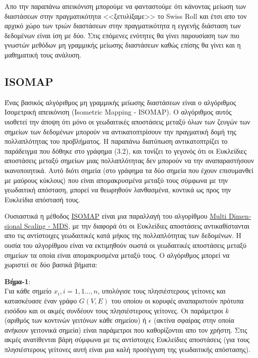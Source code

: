 \par
\vspace*{1cm}
Απο την παραπάνω απεικόνιση μπορούμε να φανταστούμε ότι κάνοντας μείωση των διαστάσεων στην πραγματικότητα <<ξετυλίξαμε>> το \textlatin{Swiss Roll} και έτσι απο τον αρχικό χώρο των τριών διαστάσεων στην πραγματικότητα η εγγενής διάσταση των δεδομένων είναι ίση με δύο. Στις επόμενες ενότητες θα γίνει παρουσίαση των πιο γνωστών μεθόδων μη γραμμικής μείωσης διαστάσεων καθώς επίσης θα γίνει και η μαθηματική τους ανάλυση.


\subsection{\textlatin{ISOMAP}}
\par
Ένας βασικός αλγόριθμος μη γραμμικής μείωσης διαστάσεων είναι ο αλγόριθμος Ισομετρική απεικόνιση \textlatin{(Isometric Mapping - ISOMAP)}\textlatin{\cite{isomap}}. Ο αλγόριθμος αυτός υιοθετεί την άποψη ότι μόνο οι γεωδαιτικές αποστάσεις μεταξύ όλων των ζευγών των σημείων των δεδομένων μπορούν να αντικατοπτρίσουν την πραγματική δομή της πολλαπλότητας του προβλήματος. Η παραπάνω διατύπωση αντικατοπτρίζει το παράδειγμα που δόθηκε στο γράφημα (3.2), και τονίζει το γεγονός ότι οι Ευκλείδιες αποστάσεις μεταξύ σημείων μιας πολλαπλότητας δεν μπορούν να την αναπαραστήσουν ικανοποιητικά. Αυτό διότι σημεία (στο γράφημα τα δύο σημεία που έχουν επισυμανθεί με μαύρους κύκλους) που είναι απομακρυσμένα μεταξύ τους σύμφωνα με την γεωδαιτική απόσταση, μπορεί να θεωρηθούν λανθασμένα, κοντικά ως προς την Ευκλείδια απόστασή τους.
\par
Ουσιαστικά η μέθοδος \href{http://isomap.stanford.edu/}{\textlatin{ISOMAP}} είναι μια παραλλαγή του αλγορίθμου \href{https://en.wikipedia.org/wiki/Multidimensional_scaling}{\textlatin{Multi Dimensional Scaling - MDS}}, με την διαφορά ότι οι Ευκλείδιες αποστάσεις αντικαθίστανται απο τις αντίστοιχες γεωδαιτικές κατά μήκος της πολλαπλότητας των δεδομένων. Η ουσία του αλγορίθμου είναι να εκτιμηθούν σωστά οι γεωδαιτικές αποστάσεις μεταξύ σημείων τα οποία είναι απομακρυσμένα μεταξύ τους. Ο αλγόριθμος μπορεί να χωριστεί σε δύο βασικά βήματα:
\par
\textbf{Βήμα-1}: \\ Για κάθε σημείο $x_{i},i=1,1\ldots,n$, υπολόγισε τους πλησιέστερους γείτονες και κατασκέυασε έναν γράφο $G(V,E)$ του οποίου οι κορυφές αναπαριστούν πρότυπα εισόδου και οι ακμές συνδέουν τους πλησιέστερους γείτονες. Οι παράμετροι $k$ (αριθμός των κοντινών γειτόνων κάθε σημείου) ή $\epsilon$ (ακτίνα σφαίρας στην οποία ανήκουν γειτονικά σημεία) είναι παράμετροι που καθορίζονται απο τον χρήστη. Στις ακμές ανατίθενται βάρη σύμφωνα με τις αντίστοιχες Ευκλείδιες αποστάσεις (για τους πλησιέστερους γείτονες αυτή είναι μια καλή προσέγγιση της γεωδαιτικής απόστασης).
